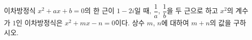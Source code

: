 이차방정식 $x^2+ax+b=0$의 한 근이 $1-2i$일 때, $\dfrac{1}{a}$, $\dfrac{1}{b}$을 두 근으로 하고 $x^2$의 계수가 $1$인 이차방정식은 $x^2+mx-n=0$이다. 상수 $m$, $n$에 대하여 $m+n$의 값을 구하시오. 
